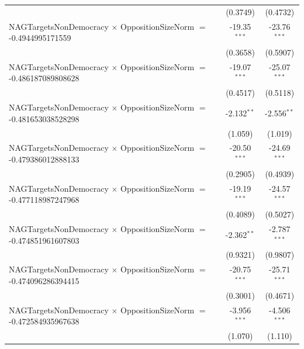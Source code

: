 \begin{tabular}{lcc}
                                                                                & (0.3749)             & (0.4732)\\   
   NAGTargetsNonDemocracy $\times$ OppositionSizeNorm $=$ -0.4944995171559      & -19.35$^{***}$       & -23.76$^{***}$\\   
                                                                                & (0.3658)             & (0.5907)\\   
   NAGTargetsNonDemocracy $\times$ OppositionSizeNorm $=$ -0.486187089808628    & -19.07$^{***}$       & -25.07$^{***}$\\   
                                                                                & (0.4517)             & (0.5118)\\   
   NAGTargetsNonDemocracy $\times$ OppositionSizeNorm $=$ -0.481653038528298    & -2.132$^{**}$        & -2.556$^{**}$\\   
                                                                                & (1.059)              & (1.019)\\   
   NAGTargetsNonDemocracy $\times$ OppositionSizeNorm $=$ -0.479386012888133    & -20.50$^{***}$       & -24.69$^{***}$\\   
                                                                                & (0.2905)             & (0.4939)\\   
   NAGTargetsNonDemocracy $\times$ OppositionSizeNorm $=$ -0.477118987247968    & -19.19$^{***}$       & -24.57$^{***}$\\   
                                                                                & (0.4089)             & (0.5027)\\   
   NAGTargetsNonDemocracy $\times$ OppositionSizeNorm $=$ -0.474851961607803    & -2.362$^{**}$        & -2.787$^{***}$\\   
                                                                                & (0.9321)             & (0.9807)\\   
   NAGTargetsNonDemocracy $\times$ OppositionSizeNorm $=$ -0.474096286394415    & -20.75$^{***}$       & -25.71$^{***}$\\   
                                                                                & (0.3001)             & (0.4671)\\   
   NAGTargetsNonDemocracy $\times$ OppositionSizeNorm $=$ -0.472584935967638    & -3.956$^{***}$       & -4.506$^{***}$\\   
                                                                                & (1.070)              & (1.110)\\   

\end{tabular}
